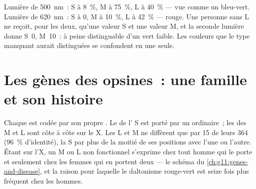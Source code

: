 \begin{example}\label{ex:g11:the-eye:curves}
Lumière de \qty{500}{nm}~:  S à 8~\%, M à 75~\%, L à 40~\% ---
vue comme un bleu-vert. Lumière de \qty{620}{nm}~: S à 0, M à 10~\%, L
à 42~\% --- rouge. Une personne sans  L ne reçoit, pour les deux,
qu'une valeur S et une valeur M, et la seconde lumière donne S~0,
M~10~: à peine distinguable d'un vert faible. Les couleurs que le type
manquant aurait distinguées se confondent en une seule.
\end{example}

\section{Les gènes des opsines~: une famille et son histoire}

\begin{proposition}\label{prop:g11:the-eye:genes}
Chaque  est codée par son propre . Le  de l' S est
porté par un  ordinaire~; les  des  M et L sont
côte à côte sur le  X. Les  L et M ne diffèrent que
par 15 de leurs 364  (96~\% d'identité), la  S par
plus de la moitié de ses positions avec l'une ou l'autre. Étant sur
l'X, un  M ou L non fonctionnel s'exprime chez tout homme qui le
porte et seulement chez les femmes qui en portent deux --- le schéma du
\cref{ch:g11:genes-and-disease}, et la raison pour laquelle le
daltonisme rouge-vert est seize fois plus fréquent chez les hommes.
\end{proposition}
\admitted

